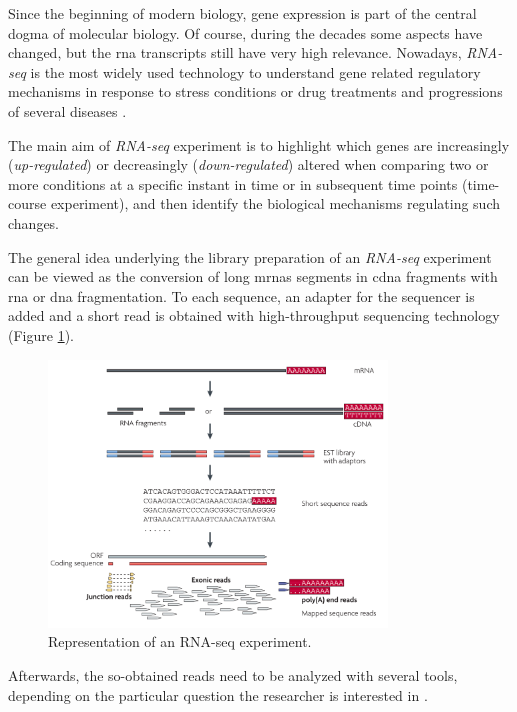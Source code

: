 Since the beginning of modern biology, gene expression is part of the central dogma of molecular biology.
Of course, during the decades some aspects have changed, but the \gls{rna} transcripts still have very high relevance.
Nowadays, \textit{RNA-seq} \cite{Thermes2014, Wang2009, Costa2010, Ozsolak2011} is the most widely used technology to understand gene related regulatory mechanisms in response to stress conditions or drug treatments and progressions of several diseases \cite{Costa2013}.

The main aim of \textit{RNA-seq} experiment is to highlight which genes are increasingly (\textit{up-regulated}) or decreasingly (\textit{down-regulated}) altered when comparing two or more conditions at a specific instant in time or in subsequent time points (time-course experiment), and then identify the biological mechanisms regulating such changes.

The general idea underlying the library preparation of an \textit{RNA-seq} experiment can be viewed as the conversion of long \glspl{mrna} segments in \gls{cdna} fragments with \gls{rna} or \gls{dna} fragmentation. 
To each sequence, an adapter for the sequencer is added and a short read is obtained with high-throughput sequencing technology (Figure \ref{fig:rnaseqexp}).

\begin{figure}[h]
\centering
\includegraphics[width=9cm, keepaspectratio]{img/intro/rna-seq.png}
\caption[RNA-seq experiment]{Representation of an RNA-seq experiment. \cite{Wang2009}}
\label{fig:rnaseqexp}

\end{figure}

Afterwards, the so-obtained reads need to be analyzed with several tools, depending on the particular question the researcher is interested in \cite{Pepke2009, Oshlack2010}.


